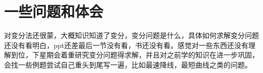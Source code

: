 \documentclass{article}
\begin{document}
       
       
\section{一些问题和体会}\setlength{\parindent}{2em}
对变分法还很蒙，大概知识知道了变分，变分问题是什么，具体如何求解变分问题还没有看明白，ppt还差最后一节没有看，书还没有看。感觉对一些东西还没有理解到位，下星期会着重研究变分问题得求解，并且对之前学的知识在进一步巩固，会找一些例题尝试自己重头到尾写一遍，比如最速降线，最短曲线之类的问题。
\end{document}
